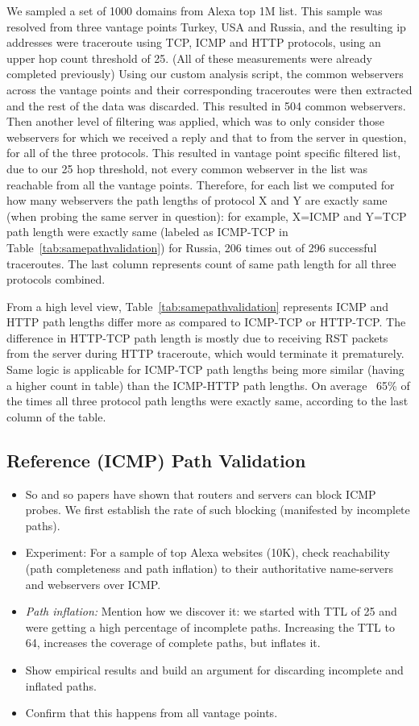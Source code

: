 We sampled a set of 1000 domains from Alexa top 1M list. This sample was resolved from three vantage points Turkey, USA and Russia, and the resulting ip addresses were traceroute using TCP, ICMP and HTTP protocols, using an upper hop count threshold of 25. (All of these measurements were already completed previously)
Using our custom analysis script, the common webservers across the vantage points and their corresponding traceroutes were then extracted and the rest of the data was discarded. This resulted in 504 common webservers. Then another level of filtering was applied, which was to only consider those webservers for which we received a reply and that to from the server in question, for all of the three protocols.
This resulted in vantage point specific filtered list, due to our 25 hop threshold, not every common webserver in the list was reachable from all the vantage points. Therefore, for each list we computed for how many webservers the path lengths of protocol X and Y are exactly same (when probing the same server in question): for example, X=ICMP and Y=TCP path length were exactly same (labeled as ICMP-TCP in Table~\ref{tab:samepathvalidation}) for Russia, 206 times out of 296 successful traceroutes. The last column represents count of same path length for all three protocols combined.

From a high level view, Table~\ref{tab:samepathvalidation} represents ICMP and HTTP path lengths differ more as compared to ICMP-TCP or HTTP-TCP. The difference in HTTP-TCP path length is mostly due to receiving RST packets from the server during HTTP traceroute, which would terminate it prematurely. Same logic is applicable for ICMP-TCP path lengths being more similar (having a higher count in table) than the ICMP-HTTP path lengths. On average ~65\% of the times all three protocol path lengths were exactly same, according to the last column of the table.

\subsection{Reference (ICMP) Path Validation}
\begin{itemize}
    \item So and so papers have shown that routers and servers can block ICMP
        probes.  We first establish the rate of such blocking (manifested by
        incomplete paths).
     \item Experiment: For a sample of top Alexa websites (10K), check
         reachability (path completeness and path inflation) to their
         authoritative name-servers and webservers over ICMP.  
     \item \textit{Path inflation:} Mention how we discover it: we started with
         TTL of 25 and were getting a high percentage of incomplete paths.
         Increasing the TTL to 64, increases the coverage of complete paths,
         but inflates it.
     \item Show empirical results and build an argument for discarding
         incomplete and inflated paths.
     \item Confirm that this happens from all vantage points.
\end{itemize}

